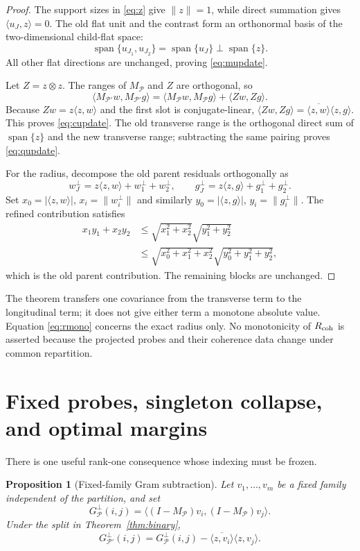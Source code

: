 \documentclass[10pt]{article}
\newtheorem{proposition}[theorem]{Proposition}
\newcommand{\ip}[2]{\langle #1,#2\rangle}
\newcommand{\norm}[1]{\lVert #1\rVert}
\newcommand{\conj}[1]{\overline{#1}}
\newcommand{\M}{M_{\mathcal P}}
\newcommand{\Mp}{M_{\mathcal P'}}
\begin{document}
\begin{proof}
The support sizes in \eqref{eq:z} give $\norm z=1$, while direct summation
gives $\ip{u_J}{z}=0$.  The old flat unit and the contrast form an
orthonormal basis of the two-dimensional child-flat space:
\[
 \operatorname{span}\{u_{J_1},u_{J_2}\}
 =\operatorname{span}\{u_J\}\mathbin{\perp}
  \operatorname{span}\{z\}.
\]
All other flat directions are unchanged, proving \eqref{eq:mupdate}.

Let $Z=z\otimes z$.  The ranges of $\M$ and $Z$ are orthogonal, so
\[
 \ip{\Mp w}{\Mp g}=\ip{\M w}{\M g}+\ip{Zw}{Zg}.
\]
Because $Zw=z\ip zw$ and the first slot is conjugate-linear,
$\ip{Zw}{Zg}=\conj{\ip zw}\ip zg$.  This proves \eqref{eq:cupdate}.
The old transverse range is the orthogonal direct sum of $\operatorname{span}
\{z\}$ and the new transverse range; subtracting the same pairing proves
\eqref{eq:qupdate}.

For the radius, decompose the old parent residuals orthogonally as
\[
 w_J^\perp=z\ip zw+w_1^\perp+w_2^\perp,\qquad
 g_J^\perp=z\ip zg+g_1^\perp+g_2^\perp.
\]
Set $x_0=|\ip zw|$, $x_i=\norm{w_i^\perp}$ and similarly
$y_0=|\ip zg|$, $y_i=\norm{g_i^\perp}$.  The refined contribution satisfies
\begin{align*}
 x_1y_1+x_2y_2
 &\leq \sqrt{x_1^2+x_2^2}\sqrt{y_1^2+y_2^2}\\
 &\leq \sqrt{x_0^2+x_1^2+x_2^2}
          \sqrt{y_0^2+y_1^2+y_2^2},
\end{align*}
which is the old parent contribution.  The remaining blocks are unchanged.
\end{proof}

The theorem transfers one covariance from the transverse term to the
longitudinal term; it does not give either term a monotone absolute value.
Equation \eqref{eq:rmono} concerns the exact radius only.  No monotonicity of
$R_{\rm coh}$ is asserted because the projected probes and their coherence
data change under common repartition.

\section{Fixed probes, singleton collapse, and optimal margins}

There is one useful rank-one consequence whose indexing must be frozen.

\begin{proposition}[Fixed-family Gram subtraction]\label{prop:gram}
Let $v_1,\ldots,v_m$ be a fixed family independent of the partition, and set
\[
 G_{\mathcal P}^{\perp}(i,j)
 =\ip{(I-\M)v_i}{(I-\M)v_j}.
\]
Under the split in Theorem~\ref{thm:binary},
\begin{equation}\label{eq:gramupdate}
 G_{\mathcal P'}^{\perp}(i,j)
 =G_{\mathcal P}^{\perp}(i,j)
  -\conj{\ip{z}{v_i}}\ip{z}{v_j}.
\end{equation}
\end{proposition}
\end{document}
